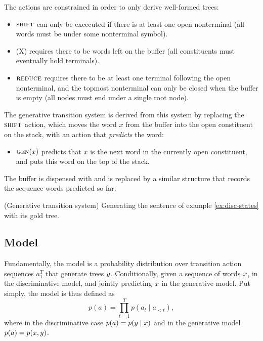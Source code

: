  The actions are constrained in order to only derive well-formed trees:
\begin{itemize}
  \item $\textsc{shift}$ can only be excecuted if there is at least one open nonterminal (all words must be under some nonterminal symbol).
  \item \open(X) requires there to be words left on the buffer (all constituents must eventually hold terminals).
  \item $\textsc{reduce}$ requires there to be at least one terminal following the open nonterminal, and the topmost nonterminal can only be closed when the buffer is empty (all nodes must end under a single root node).
\end{itemize}
The generative transition system is derived from this system by replacing the $\textsc{shift}$ action, which moves the word $x$ from the buffer into the open constituent on the stack, with an action that \textit{predicts} the word:
\begin{itemize}
  \item $\textsc{gen}(x)$ predicts that $x$ is the next word in the currently open constituent, and puts this word on the top of the stack.
\end{itemize}
The buffer is dispensed with and is replaced by a similar structure that records the sequence words predicted so far.

\begin{example}{(Generative transition system)} Generating the sentence of example \ref{ex:disc-states} with its gold tree.
  
\end{example}


\subsection{Model}

Fundamentally, the model is a probability distribution over transition action sequences $a_1^T$ that generate trees $y$. Conditionally, given a sequence of words $x$, in the discriminative model, and jointly predicting $x$ in the generative model. Put simply, the model is thus defined as
\begin{equation}
  \label{eq:naive-rnng-model}
  p( a ) = \prod_{t=1}^T p( a_t \mid a_{<t} ),
\end{equation}
where in the discriminative case $p( a ) = p( y \mid x )$ and in the generative model $p( a ) = p( x, y )$.

